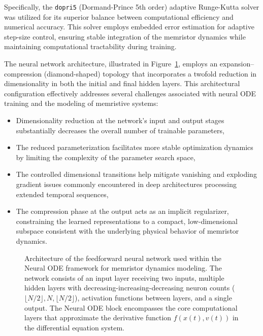 \documentclass[lettersize,journal]{IEEEtran}
\newcommand{\ua}{v}
\newcommand{\xw}{x}
\begin{document}
Specifically, the \texttt{dopri5} (Dormand-Prince 5th order) adaptive Runge-Kutta solver was utilized for its superior balance between computational efficiency and numerical accuracy. This solver employs embedded error estimation for adaptive step-size control, ensuring stable integration of the memristor dynamics while maintaining computational tractability during training.

The neural network architecture, illustrated in Figure~\ref{fig:nn-arch}, employs an expansion–compression (diamond-shaped) topology that incorporates a twofold reduction in dimensionality in both the initial and final hidden layers. This architectural configuration effectively addresses several challenges associated with neural ODE training and the modeling of memristive systems:
\begin{itemize}
  \item Dimensionality reduction at the network’s input and output stages substantially decreases the overall number of trainable parameters,
  \item The reduced parameterization facilitates more stable optimization dynamics by limiting the complexity of the parameter search space,
  \item The controlled dimensional transitions help mitigate vanishing and exploding gradient issues commonly encountered in deep architectures processing extended temporal sequences,
  \item The compression phase at the output acts as an implicit regularizer, constraining the learned representations to a compact, low-dimensional subspace consistent with the underlying physical behavior of memristor dynamics.
\end{itemize}


\begin{figure}[ht!]
  \centering
  \resizebox{2in}{!}{%
    
  }
  \caption{Architecture of the feedforward neural network used within the Neural ODE framework for memristor dynamics modeling. The network consists of an input layer receiving two inputs, multiple hidden layers with decreasing-increasing-decreasing neuron counts (\(\lfloor N/2 \rfloor, N, \lfloor N/2 \rfloor\)), activation functions between layers, and a single output. The Neural ODE block encompasses the core computational layers that approximate the derivative function \(f(\xw(t), \ua(t))\) in the differential equation system.}

  \label{fig:nn-arch}
\end{figure}
\end{document}
